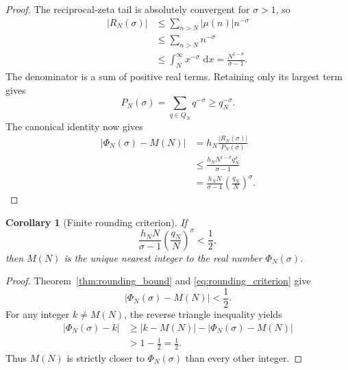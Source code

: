 \documentclass[11pt]{amsart}
\numberwithin{equation}{section}
\theoremstyle{plain}
\newtheorem{corollary}[theorem]{Corollary}
\theoremstyle{definition}
\theoremstyle{remark}
\newcommand{\1}{\mathbf{1}}
\newcommand{\dd}{\,\mathrm{d}}
\begin{document}
\begin{proof}
The reciprocal-zeta tail is absolutely convergent for \(\sigma>1\), so
\begin{align}
|R_N(\sigma)|
&\leq
\sum_{n>N}|\mu(n)|n^{-\sigma}
\label{eq:rounding_abs_mu}
\\
&\leq
\sum_{n>N}n^{-\sigma}
\label{eq:rounding_drop_mu}
\\
&\leq
\int_N^\infty x^{-\sigma}\,\dd x
=
\frac{N^{1-\sigma}}{\sigma-1}.
\label{eq:rounding_integral_detailed}
\end{align}
The denominator is a sum of positive real terms.  Retaining only its
largest term gives
\begin{equation}
P_N(\sigma)
=
\sum_{q\in Q_N}q^{-\sigma}
\geq
q_N^{-\sigma}.
\label{eq:rounding_P_positive}
\end{equation}
The canonical identity now gives
\begin{align}
|\Phi_N(\sigma)-M(N)|
&=
h_N\frac{|R_N(\sigma)|}{P_N(\sigma)}
\label{eq:rounding_identity_use}
\\
&\leq
\frac{h_NN^{1-\sigma}q_N^\sigma}{\sigma-1}
\label{eq:rounding_combine}
\\
&=
\frac{h_NN}{\sigma-1}
\left(\frac{q_N}{N}\right)^\sigma.
\label{eq:rounding_final_detailed}
\end{align}
\end{proof}

\begin{corollary}[Finite rounding criterion]
\label{cor:rounding_criterion}
If
\begin{equation}
\boxed{
\frac{h_NN}{\sigma-1}
\left(\frac{q_N}{N}\right)^\sigma
<
\frac12,
}
\label{eq:rounding_criterion}
\end{equation}
then \(M(N)\) is the unique nearest integer to the real number
\(\Phi_N(\sigma)\).
\end{corollary}

\begin{proof}
Theorem~\ref{thm:rounding_bound} and
\eqref{eq:rounding_criterion} give
\begin{equation}
|\Phi_N(\sigma)-M(N)|<\frac12.
\label{eq:rounding_criterion_proof_ball}
\end{equation}
For any integer \(k\neq M(N)\), the reverse triangle inequality yields
\begin{align}
|\Phi_N(\sigma)-k|
&\geq
|k-M(N)|-|\Phi_N(\sigma)-M(N)|
\label{eq:rounding_reverse_triangle_one}
\\
&>
1-\frac12
=
\frac12.
\label{eq:rounding_reverse_triangle_two}
\end{align}
Thus \(M(N)\) is strictly closer to \(\Phi_N(\sigma)\) than every other
integer.
\end{proof}
\end{document}
